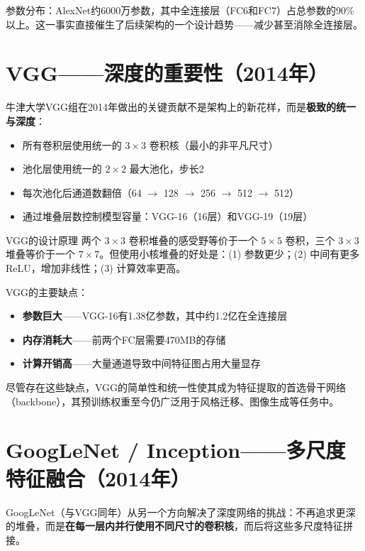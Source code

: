 参数分布：AlexNet约6000万参数，其中全连接层（FC6和FC7）占总参数的90\%以上。这一事实直接催生了后续架构的一个设计趋势——减少甚至消除全连接层。

\section{VGG——深度的重要性（2014年）}

牛津大学VGG组在2014年做出的关键贡献不是架构上的新花样，而是\textbf{极致的统一与深度}：

\begin{itemize}
    \item 所有卷积层使用统一的 $3\times3$ 卷积核（最小的非平凡尺寸）
    \item 池化层使用统一的 $2\times2$ 最大池化，步长2
    \item 每次池化后通道数翻倍（64 $\to$ 128 $\to$ 256 $\to$ 512 $\to$ 512）
    \item 通过堆叠层数控制模型容量：VGG-16（16层）和VGG-19（19层）
\end{itemize}

\begin{myTheorem}{VGG的设计原理}
两个 $3\times3$ 卷积堆叠的感受野等价于一个 $5\times5$ 卷积，三个 $3\times3$ 堆叠等价于一个 $7\times7$。但使用小核堆叠的好处是：(1) 参数更少；(2) 中间有更多ReLU，增加非线性；(3) 计算效率更高。
\end{myTheorem}

VGG的主要缺点：
\begin{itemize}
    \item \textbf{参数巨大}——VGG-16有1.38亿参数，其中约1.2亿在全连接层
    \item \textbf{内存消耗大}——前两个FC层需要470MB的存储
    \item \textbf{计算开销高}——大量通道导致中间特征图占用大量显存
\end{itemize}

尽管存在这些缺点，VGG的简单性和统一性使其成为特征提取的首选骨干网络（backbone），其预训练权重至今仍广泛用于风格迁移、图像生成等任务中。

\section{GoogLeNet / Inception——多尺度特征融合（2014年）}

GoogLeNet（与VGG同年）从另一个方向解决了深度网络的挑战：不再追求更深的堆叠，而是\textbf{在每一层内并行使用不同尺寸的卷积核}，而后将这些多尺度特征拼接。

